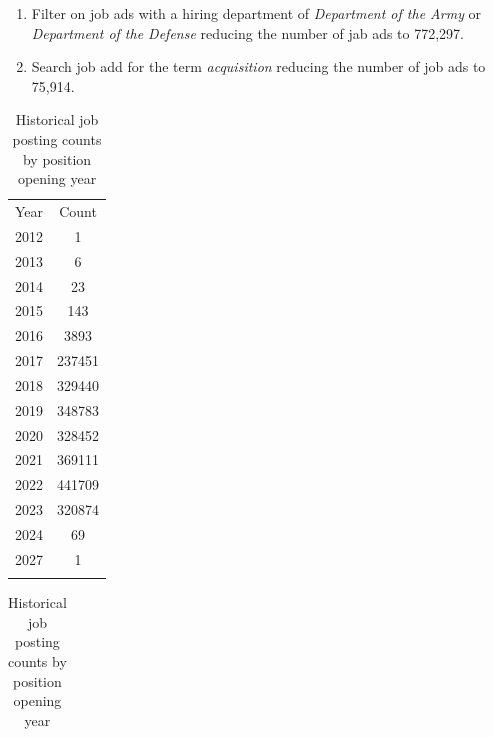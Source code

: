 \documentclass[12pt]{article}
\begin{document}
\begin{enumerate}[label=\textbf{Step \arabic*:}, left=0pt]
    \item Filter on job ads with a hiring department of \textit{Department of the Army} or \textit{Department of the Defense} reducing the number of jab ads to 772,297.
    \item Search job add for the term \textit{acquisition} reducing the number of job ads to 75,914.
\end{enumerate}

\begin{table}[ht!]
    \centering
    \vspace*{4mm}
    \begin{subtable}[b]{0.4\linewidth}
        \centering
        \begin{tabular}{cc}
            \Xhline{3\arrayrulewidth}
            Year &   Count \\\Xhline{3\arrayrulewidth}
            2012 &       1 \\
            2013 &       6 \\
            2014 &      23 \\
            2015 &     143 \\
            2016 &    3893 \\
            2017 &  237451 \\
            2018 &  329440 \\
            2019 &  348783 \\
            2020 &  328452 \\
            2021 &  369111 \\
            2022 &  441709 \\
            2023 &  320874 \\
            2024 &      69 \\
            2027 &       1 \\
            \Xhline{3\arrayrulewidth}
        \end{tabular}
        \caption{Historical job posting counts by position opening year}\label{tab:job_opening_count}
    \end{subtable}
    \begin{subtable}[b]{0.4\linewidth}
        \centering
        \vspace*{4mm}
        \begin{tabular}{cc}

\end{tabular}
\end{subtable}
\end{table}
\end{document}
